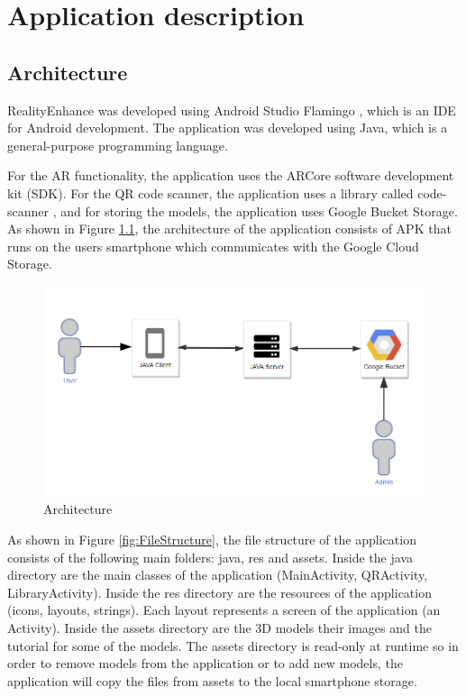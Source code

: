 \chapter{Application description}\label{chapter:appdescription}

\section{Architecture}
RealityEnhance was developed using Android Studio Flamingo \cite{AndroidStudio}, which is an \ac{IDE} for Android development. The application was developed using Java\cite{Java}, which is a general-purpose programming language.

For the \ac{AR} functionality, the application uses the ARCore software development kit (SDK).
For the \ac{QR} code scanner, the application uses a library called code-scanner \cite{code-scanner}, and for storing the models, the application uses Google Bucket Storage.
As shown in Figure \ref{fig:architecture}, the architecture of the application consists of \ac{APK} that runs on the users smartphone which communicates with the Google Cloud Storage.

\begin{figure}[ht]
    \centering
    \includegraphics[width=1\textwidth]{img/architecture.png}
    \caption{Architecture}
    \label{fig:architecture}
\end{figure}

\newpage

As shown in Figure \ref{fig:FileStructure}, the file structure of the application consists of the following main folders: java, res and  assets. Inside the java directory are the main classes of the application (MainActivity, QRActivity, LibraryActivity). Inside the res directory are the resources of the application (icons, layouts, strings). Each layout represents a screen of the application (an Activity). Inside the assets directory are the \ac{3D} models their images and the tutorial for some of the models. The assets directory is read-only at runtime so in order to remove models from the application or to add new models, the application will copy the files from assets to the local smartphone storage.

